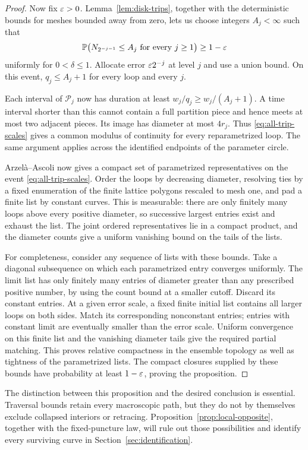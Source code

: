 \begin{proof}
Now fix $\varepsilon>0$. Lemma~\ref{lem:disk-trips}, together with the
deterministic bounds for meshes bounded away from zero, lets us choose
integers $A_j<\infty$ such that
\begin{equation}
 \mathbb P\bigl(N_{2^{-j-1}}\le A_j\text{ for every }j\ge1\bigr)
 \ge1-\varepsilon
 \label{eq:all-trip-scales}
\end{equation}
uniformly for $0<\delta\le1$. Allocate error $\varepsilon2^{-j}$ at level
$j$ and use a union bound. On this event, $q_j\le A_j+1$ for every
loop and every $j$.

Each interval of $\mathcal P_j$ now has duration at least
$w_j/q_j\ge w_j/(A_j+1)$.  A time interval shorter than this cannot
contain a full partition piece and hence meets at most two adjacent
pieces.  Its image has diameter at most $4r_j$.  Thus
\eqref{eq:all-trip-scales} gives a common modulus of continuity for
every reparametrized loop.  The same argument applies across the
identified endpoints of the parameter circle.

Arzel\`a--Ascoli now gives a compact set of parametrized representatives
on the event \eqref{eq:all-trip-scales}.  Order the loops by decreasing
diameter, resolving ties by a fixed enumeration of the finite lattice
polygons rescaled to mesh one, and pad a finite list by constant curves.
This is measurable:
there are only finitely many loops above every positive diameter, so
successive largest entries exist and exhaust the list.  The joint
ordered representatives lie in a compact product, and the diameter
counts give a uniform vanishing bound on the tails of the lists.

For completeness, consider any sequence of lists with these bounds.
Take a diagonal subsequence on which each parametrized entry converges
uniformly.  The limit list has only finitely many entries of diameter
greater than any prescribed positive number, by using the count bound
at a smaller cutoff.  Discard its constant entries.  At a given error
scale, a fixed finite initial list contains all larger loops on both
sides.  Match its corresponding nonconstant entries; entries with
constant limit are eventually smaller than the error scale.  Uniform
convergence on this finite list and the vanishing diameter tails give
the required partial matching.  This proves relative compactness in
the ensemble topology as well as tightness of the parametrized lists.
The compact closures supplied by these bounds have probability at
least $1-\varepsilon$, proving the proposition.
\end{proof}

The distinction between this proposition and the desired conclusion is
essential.  Traversal bounds retain every macroscopic path, but they
do not by themselves exclude collapsed interiors or retracing.
Proposition~\ref{prop:local-opposite}, together with the fixed-puncture
law, will rule out those possibilities and identify every surviving
curve in Section~\ref{sec:identification}.
